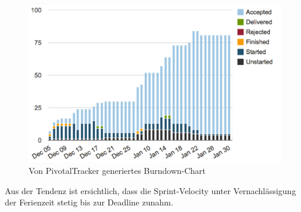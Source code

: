 \begin{figure}[h]
	\centering
	\hspace{1.6cm}\includegraphics[width=.6\textwidth]{Pictures/burndown-compiled}
	\caption{Von PivotalTracker generiertes Burndown-Chart \label{fig:BurndownCompiled}}
\end{figure}

	Aus der Tendenz ist ersichtlich, dass die Sprint-Velocity unter Vernachlässigung der Ferienzeit stetig bis zur Deadline zunahm.